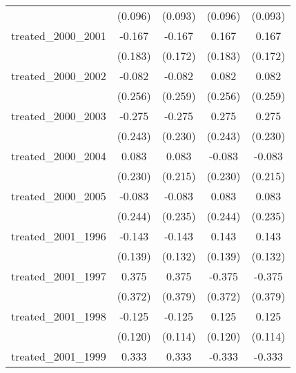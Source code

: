 {\begin{tabular}{l*{4}{c}}
            &     (0.096)         &     (0.093)         &     (0.096)         &     (0.093)         \\
[1em]
treated\_2000\_2001&      -0.167         &      -0.167         &       0.167         &       0.167         \\
            &     (0.183)         &     (0.172)         &     (0.183)         &     (0.172)         \\
[1em]
treated\_2000\_2002&      -0.082         &      -0.082         &       0.082         &       0.082         \\
            &     (0.256)         &     (0.259)         &     (0.256)         &     (0.259)         \\
[1em]
treated\_2000\_2003&      -0.275         &      -0.275         &       0.275         &       0.275         \\
            &     (0.243)         &     (0.230)         &     (0.243)         &     (0.230)         \\
[1em]
treated\_2000\_2004&       0.083         &       0.083         &      -0.083         &      -0.083         \\
            &     (0.230)         &     (0.215)         &     (0.230)         &     (0.215)         \\
[1em]
treated\_2000\_2005&      -0.083         &      -0.083         &       0.083         &       0.083         \\
            &     (0.244)         &     (0.235)         &     (0.244)         &     (0.235)         \\
[1em]
treated\_2001\_1996&      -0.143         &      -0.143         &       0.143         &       0.143         \\
            &     (0.139)         &     (0.132)         &     (0.139)         &     (0.132)         \\
[1em]
treated\_2001\_1997&       0.375         &       0.375         &      -0.375         &      -0.375         \\
            &     (0.372)         &     (0.379)         &     (0.372)         &     (0.379)         \\
[1em]
treated\_2001\_1998&      -0.125         &      -0.125         &       0.125         &       0.125         \\
            &     (0.120)         &     (0.114)         &     (0.120)         &     (0.114)         \\
[1em]
treated\_2001\_1999&       0.333         &       0.333         &      -0.333         &      -0.333         \\

\end{tabular}}
